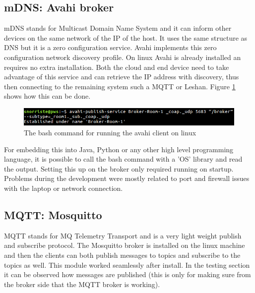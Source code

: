 \documentclass[11pt]{article}
\begin{document}


\subsection{mDNS: Avahi broker}
mDNS stands for Multicast Domain Name System and it can inform other devices on the same network of the IP of the host. It uses the same structure as DNS but it is a zero configuration service. Avahi implements this zero configuration network discovery profile. On linux Avahi is already installed an requires no extra installation. Both the cloud and end device need to take advantage of this service and can retrieve the IP address with discovery, thus then connecting to the remaining system such a MQTT or Leshan. Figure \ref{fig:avahi} shows how this can be done.

\begin{figure}[h]
	\begin{center}
		\includegraphics[width=1.1\linewidth]{img/avahi}
		\caption{The bash command for running the avahi client on linux}
		\label{fig:avahi}
	\end{center}
\end{figure}


For embedding this into Java, Python or any other high level programming language, it is possible to call the bash command with a 'OS' library and read the output. Setting this up on the broker only required running on startup. Problems during the development were mostly related to port and firewall issues with the laptop or network connection.

\subsection{MQTT: Mosquitto}
MQTT stands for MQ Telemetry Transport and is a very light weight publish and subscribe protocol. The Mosquitto broker is installed on the linux machine and then the clients can both publish messages to topics and subscribe to the topics as well. This module worked seamlessly after install. In the testing section it can be observed how messages are published (this is only for making sure from the broker side that the MQTT broker is working).







\printbibliography
\end{document}
